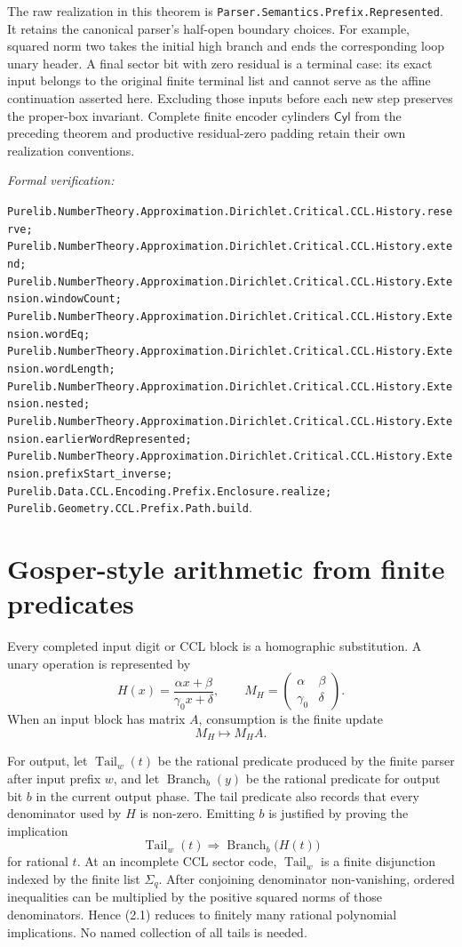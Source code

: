 \documentclass[10pt]{article}
\theoremstyle{definition}
\theoremstyle{remark}
\newcommand{\Cyl}{\mathsf{Cyl}}
\newcommand{\leanref}[1]{\par\smallskip\noindent
  \emph{Formal verification:}\par\nobreak
  {\raggedright\nolinkurl{#1}.\par}}
\newcommand{\mat}[4]{\begin{pmatrix}#1&#2\\#3&#4\end{pmatrix}}
\begin{document}
The raw realization in this theorem is
\texttt{Parser.Semantics.Prefix.Represented}. It retains the canonical
parser's half-open boundary choices. For example, squared norm two takes
the initial high branch and ends the corresponding loop unary header.
A final sector bit with zero residual is a terminal case: its exact input
belongs to the original finite terminal list and cannot serve as the
affine continuation asserted here. Excluding those inputs before each
new step preserves the proper-box invariant. Complete finite encoder
cylinders $\Cyl$ from the preceding theorem and productive residual-zero
padding retain their own realization conventions.

\leanref{Purelib.NumberTheory.Approximation.Dirichlet.Critical.CCL.History.reserve;
Purelib.NumberTheory.Approximation.Dirichlet.Critical.CCL.History.extend;
Purelib.NumberTheory.Approximation.Dirichlet.Critical.CCL.History.Extension.windowCount;
Purelib.NumberTheory.Approximation.Dirichlet.Critical.CCL.History.Extension.wordEq;
Purelib.NumberTheory.Approximation.Dirichlet.Critical.CCL.History.Extension.wordLength;
Purelib.NumberTheory.Approximation.Dirichlet.Critical.CCL.History.Extension.nested;
Purelib.NumberTheory.Approximation.Dirichlet.Critical.CCL.History.Extension.earlierWordRepresented;
Purelib.NumberTheory.Approximation.Dirichlet.Critical.CCL.History.Extension.prefixStart_inverse;
Purelib.Data.CCL.Encoding.Prefix.Enclosure.realize;
Purelib.Geometry.CCL.Prefix.Path.build}

\section{Gosper-style arithmetic from finite predicates}
\label{sec:arithmetic}

Every completed input digit or CCL block is a homographic substitution.  A unary operation is represented by
\[
 H(x)=\frac{\alpha x+\beta}{\gamma_0x+\delta},
 \qquad
 M_H=\mat{\alpha}{\beta}{\gamma_0}{\delta}.
\]
When an input block has matrix $A$, consumption is the finite update
\[
 M_H\longmapsto M_HA.
\]

For output, let $\operatorname{Tail}_w(t)$ be the rational predicate produced by the finite parser after input prefix $w$, and let $\operatorname{Branch}_b(y)$ be the rational predicate for output bit $b$ in the current output phase.  The tail predicate also records that every denominator used by $H$ is non-zero.  Emitting $b$ is justified by proving the implication
\[
 \operatorname{Tail}_w(t)\Longrightarrow
 \operatorname{Branch}_b\bigl(H(t)\bigr)
\tag{2.1}
\]
for rational $t$.  At an incomplete CCL sector code, $\operatorname{Tail}_w$ is a finite disjunction indexed by the finite list $\Sigma_q$.  After conjoining denominator non-vanishing, ordered inequalities can be multiplied by the positive squared norms of those denominators.  Hence (2.1) reduces to finitely many rational polynomial implications.  No named collection of all tails is needed.
\end{document}
